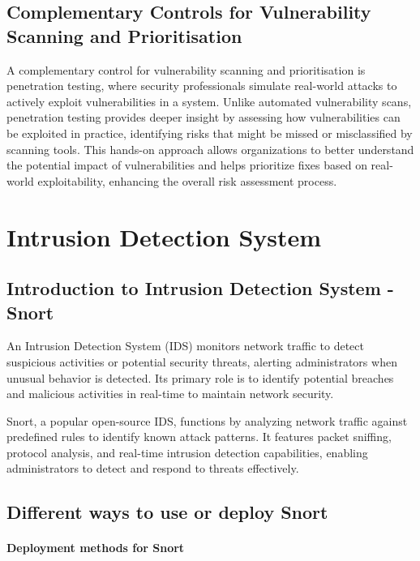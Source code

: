 \documentclass[12pt,a4paper]{report}
\begin{document}
\subsection{Complementary Controls for Vulnerability Scanning and Prioritisation}

A complementary control for vulnerability scanning and prioritisation is penetration testing, where security professionals simulate real-world attacks to actively exploit vulnerabilities in a system. Unlike automated vulnerability scans, penetration testing provides deeper insight by assessing how vulnerabilities can be exploited in practice, identifying risks that might be missed or misclassified by scanning tools. This hands-on approach allows organizations to better understand the potential impact of vulnerabilities and helps prioritize fixes based on real-world exploitability, enhancing the overall risk assessment process.

\section{Intrusion Detection System}
\subsection{Introduction to Intrusion Detection System - Snort}

An Intrusion Detection System (IDS) monitors network traffic to detect suspicious activities or potential security threats, alerting administrators when unusual behavior is detected. Its primary role is to identify potential breaches and malicious activities in real-time to maintain network security.

Snort, a popular open-source IDS, functions by analyzing network traffic against predefined rules to identify known attack patterns. It features packet sniffing, protocol analysis, and real-time intrusion detection capabilities, enabling administrators to detect and respond to threats effectively.

\subsection{Different ways to use or deploy Snort}
\paragraph{Deployment methods for Snort}
\end{document}
